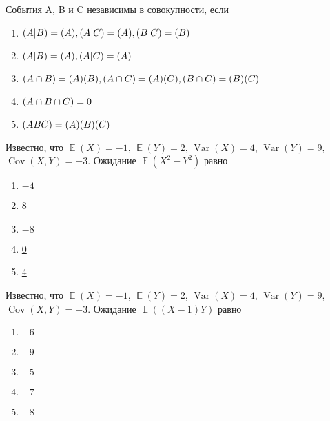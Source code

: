 \documentclass[t]{beamer}
\DeclareMathOperator{\Var}{Var}
\DeclareMathOperator{\Cov}{Cov}
\DeclareMathOperator{\E}{\mathbb{E}}
\let\P\relax
\DeclareMathOperator{\P}{\mathbb{P}}
\begin{document}
 \begin{frame} \label{16} 
\begin{block}{16} 

События A, B и C независимы в совокупности, если


 \end{block} 
\begin{enumerate} 
\item[] \hyperlink{16-No}{\beamergotobutton{}  $\P(A|B) = \P(A), \P(A|C) = \P(A), \P(B|C) = \P(B)$ }
\item[] \hyperlink{16-No}{\beamergotobutton{}  $\P(A|B) = \P(A), \P(A|C) = \P(A)$ }
\item[] \hyperlink{16-No}{\beamergotobutton{}  $\P(A\cap B) = \P(A)\P(B), \P(A\cap C) = \P(A)\P(C), \P(B\cap C) = \P(B)\P(C)$ }
\item[] \hyperlink{16-No}{\beamergotobutton{}  $\P(A \cap B \cap C) = 0$ }
\item[] \hyperlink{16-No}{\beamergotobutton{}  $\P(ABC) = \P(A) \P(B) \P(C)$ }
\end{enumerate} 
\end{frame} 


 \begin{frame} \label{17} 
\begin{block}{17} 

Известно, что $\E(X)=-1$, $\E(Y)=2$, $\Var(X)=4$, $\Var(Y)=9$, $\Cov(X,Y)=-3$. Ожидание $\E(X^2-Y^2)$ равно

  


 \end{block} 
\begin{enumerate} 
\item[] \hyperlink{17-No}{\beamergotobutton{} $-4$}
\item[] \hyperlink{17-No}{\beamergotobutton{} 8}
\item[] \hyperlink{17-Yes}{\beamergotobutton{} $-8$}
\item[] \hyperlink{17-No}{\beamergotobutton{} 0}
\item[] \hyperlink{17-No}{\beamergotobutton{} 4}
\end{enumerate} 
\end{frame} 


 \begin{frame} \label{18} 
\begin{block}{18} 

Известно, что $\E(X)=-1$, $\E(Y)=2$, $\Var(X)=4$, $\Var(Y)=9$, $\Cov(X,Y)=-3$. Ожидание $\E((X-1)Y)$ равно

  


 \end{block} 
\begin{enumerate} 
\item[] \hyperlink{18-No}{\beamergotobutton{} $-6$}
\item[] \hyperlink{18-No}{\beamergotobutton{} $-9$}
\item[] \hyperlink{18-No}{\beamergotobutton{} $-5$}
\item[] \hyperlink{18-Yes}{\beamergotobutton{} $-7$}
\item[] \hyperlink{18-No}{\beamergotobutton{} $-8$}
\end{enumerate} 
\end{frame} 
\end{document}
